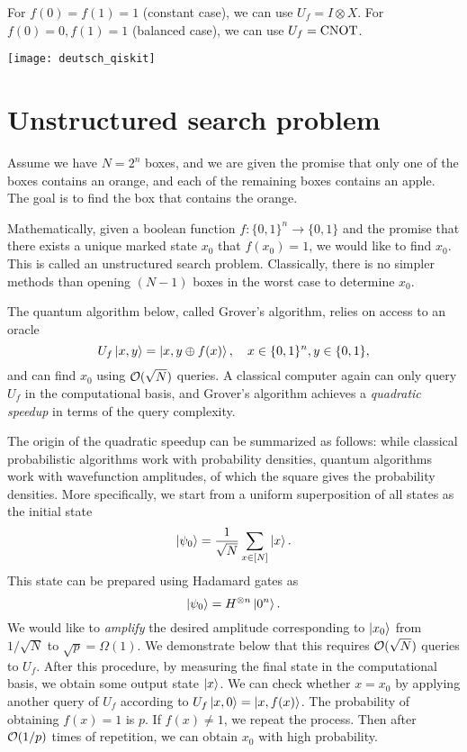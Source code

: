 \begin{exam}\label{exam:qiskit_deutsch}
For $f(0)=f(1)=1$ (constant case), we can use $U_f=I\otimes X$. 
For $f(0)=0,f(1)=1$ (balanced case), we can use $U_f=\operatorname{CNOT}$. 
\begin{center}
\texttt{[image: deutsch\_qiskit]}
\end{center}
\end{exam}



\section{Unstructured search problem}\label{sec:grover}

Assume we have $N=2^{n}$ boxes, and we are given the promise that only one of the boxes contains an orange, and each of the remaining boxes contains an apple. The goal is to find the box that contains the orange.

Mathematically, given a boolean function $f:\{0,1\}^n\to\{0,1\}$ and the promise that there exists a unique marked state $x_0$ that $f(x_0)=1$, we would like to find $x_0$.
This is called an unstructured search problem. 
Classically, there is no simpler methods than opening $(N-1)$ boxes in the worst case to determine $x_0$. 

The quantum algorithm below, called Grover's algorithm, relies on access to an oracle
\begin{equation}
U_f\ket{x,y}=\ket{x,y\oplus f(x)}, \quad x\in \{0,1\}^n,y\in \{0,1\},
\label{eqn:grover_oracle}
\end{equation}
and can find $x_0$ using $\mathcal{O}(\sqrt{N})$ queries.
A classical computer again can only query $U_f$ in the computational basis, and Grover's algorithm achieves a \emph{quadratic speedup} in terms of the query complexity. 

The origin of the quadratic speedup can be summarized as follows: while classical probabilistic algorithms work with probability densities, quantum algorithms work with wavefunction amplitudes, of which the square gives the probability densities. More specifically, we start from a uniform superposition of all states as the initial state
\begin{equation}
\ket{\psi_0}=\frac{1}{\sqrt{N}}\sum_{x\in[N]} \ket{x}.
\end{equation}
This state can be prepared using Hadamard gates as 
\begin{equation}
\ket{\psi_0}=H^{\otimes n}\ket{0^n}.
\end{equation}
We would like to \emph{amplify} the desired amplitude corresponding to $\ket{x_0}$ from $1/\sqrt{N}$ to $\sqrt{p}=\Omega(1)$. 
We demonstrate below that this requires $\mathcal{O}(\sqrt{N})$ queries to $U_f$.
After this procedure, by measuring the final state in the computational basis, we obtain some output state $\ket{x}$. We can check whether $x=x_0$ by applying another query of $U_f$ according to $U_f \ket{x,0}=\ket{x,f(x)}$. 
The probability of obtaining $f(x)=1$ is $p$.  If $f(x)\ne 1$, we repeat the process. 
Then after $\mathcal{O}(1/p)$ times of repetition, we can obtain $x_0$ with high probability.

